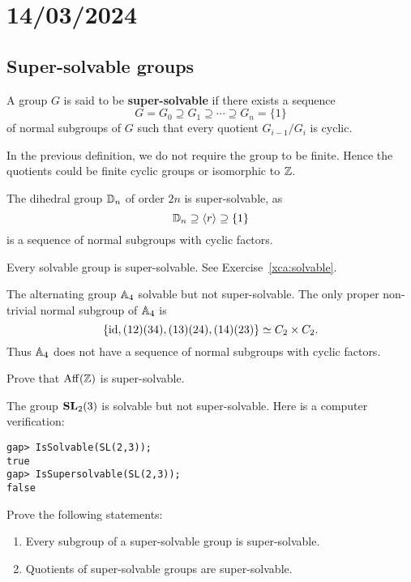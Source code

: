 \section{14/03/2024}

\subsection{Super-solvable groups}

\begin{definition}
A group $G$ is said to be \textbf{super-solvable} if there exists a sequence 
\[
G=G_0\supseteq G_1\supseteq\cdots\supseteq G_n=\{1\}
\]
of normal subgroups of $G$ such that every 
quotient $G_{i-1}/G_i$ is cyclic. 
\end{definition}

In the previous definition, we do not require the group to be finite. Hence the quotients 
could be finite cyclic groups or isomorphic to $\mathbb{Z}$. 

\begin{example}
The dihedral group $\mathbb{D}_{n}$ of order $2n$ is super-solvable, as 
\[	
\mathbb{D}_{n}\supseteq \langle
r\rangle\supseteq \{1\}
\]
is a sequence of normal subgroups with cyclic factors. 
\end{example}

Every solvable group is super-solvable. See Exercise~\ref{xca:solvable}.

\begin{example}
The alternating group $\mathbb{A}_4$ solvable but not super-solvable. The only 
proper non-trivial normal subgroup of $\mathbb{A}_4$ is 
	\[
	\{\operatorname{id},(12)(34),(13)(24),(14)(23)\}\simeq C_2\times C_2.
	\]
Thus $\mathbb{A}_4$ does not have a sequence of normal subgroups 
with cyclic factors. 
\end{example}

\begin{exercise}
\label{xca:Aff_supersolvable}
Prove that $\mathrm{Aff}(\mathbb{Z})$ is super-solvable. 
\end{exercise}

\begin{example}
The group $\mathbf{SL}_2(3)$ is solvable but not super-solvable. Here is a computer verification: 
\begin{lstlisting}
gap> IsSolvable(SL(2,3));
true
gap> IsSupersolvable(SL(2,3));
false
\end{lstlisting}
\end{example}

\begin{exercise}
\label{xca:super}
Prove the following statements: 
\begin{enumerate}
\item Every subgroup of a super-solvable group is super-solvable. 
\item Quotients of super-solvable groups are super-solvable. 
\end{enumerate}
\end{exercise}

